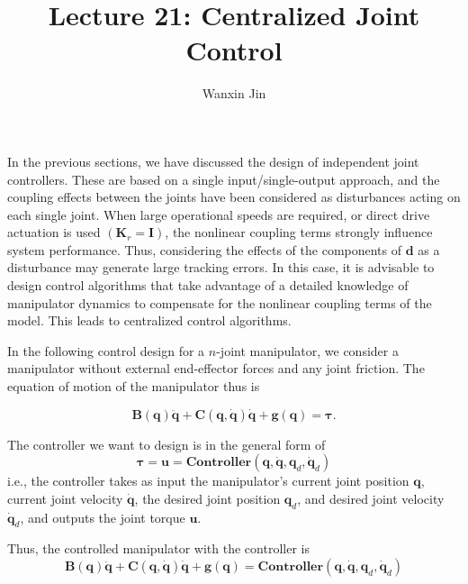 \documentclass[10pt]{article}
\begin{document}
\title{Lecture 21: Centralized Joint Control}
\author{Wanxin Jin}
\maketitle

In the previous sections, we have discussed the design of independent joint controllers. These are based on a single input/single-output approach, and the coupling effects between
the joints have been considered as disturbances acting on each single joint. When large operational speeds are required, or direct drive actuation is used $\left(\boldsymbol{K}_{r}=\boldsymbol{I}\right)$, the nonlinear coupling terms strongly influence system performance. Thus, considering the effects of the components of $\boldsymbol{d}$ as a disturbance may generate large tracking errors. In this case, it is advisable to design control algorithms that take advantage of a detailed knowledge of manipulator dynamics to compensate for the nonlinear coupling terms of the model. This leads to centralized control algorithms.


In the following control design for a $n$-joint manipulator, we consider a manipulator without external end-effector forces  and  any joint friction.   The equation of motion of the manipulator thus is 

\begin{equation}\label{equ.manipulator}
    \boldsymbol{B}(\boldsymbol{q}) \ddot{\boldsymbol{q}}+\boldsymbol{C}(\boldsymbol{q}, \dot{\boldsymbol{q}}) \dot{\boldsymbol{q}}+\boldsymbol{g}(\boldsymbol{q})=\boldsymbol{\tau}.
\end{equation}

The controller we want to design is in the general form of 
\begin{equation}\label{equ.controller}
\boldsymbol{\tau}=\boldsymbol{u}=\textbf{Controller}(\boldsymbol{q}, \boldsymbol{\dot{q}}, \boldsymbol{q}_d, \boldsymbol{\dot{q}}_d)
\end{equation}
i.e., the controller takes as input the manipulator's current joint position $\boldsymbol{q}$, current joint velocity $\boldsymbol{\dot{q}}$, the desired joint position $\boldsymbol{q}_d$, and desired joint velocity $\boldsymbol{\dot{q}}_d$, and outputs the joint torque $\boldsymbol{u}$.

Thus, the controlled manipulator  with the controller  is 
\begin{equation}\label{equ.manipulator_control}
    \boldsymbol{B}(\boldsymbol{q}) \ddot{\boldsymbol{q}}+\boldsymbol{C}(\boldsymbol{q}, \dot{\boldsymbol{q}}) \dot{\boldsymbol{q}}+\boldsymbol{g}(\boldsymbol{q})=\textbf{Controller}(\boldsymbol{q}, \boldsymbol{\dot{q}}, \boldsymbol{q}_d, \boldsymbol{\dot{q}}_d)
\end{equation}
\end{document}
